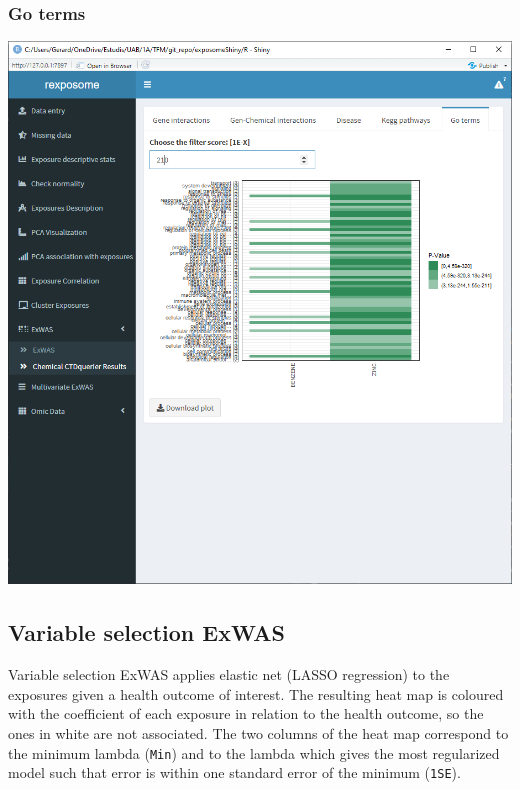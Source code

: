 \documentclass[
]{book}
\begin{document}
\hypertarget{go-terms}{%
\subsubsection{Go terms}\label{go-terms}}

\includegraphics{images/analysis7_4_7.png}

\hypertarget{variable-selection-exwas}{%
\subsection{Variable selection ExWAS}\label{variable-selection-exwas}}

Variable selection ExWAS applies elastic net (LASSO regression) to the exposures given a health outcome of interest. The resulting heat map is coloured with the coefficient of each exposure in relation to the health outcome, so the ones in white are not associated. The two columns of the heat map correspond to the minimum lambda (\texttt{Min}) and to the lambda which gives the most regularized model such that error is within one standard error of the minimum (\texttt{1SE}).
\end{document}
